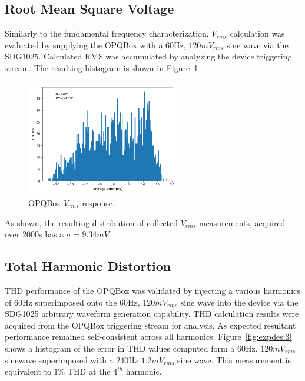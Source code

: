 \subsection{Root Mean Square Voltage}
Similarly to the fundamental frequency characterization, $V_{rms}$ calculation was evaluated by supplying the OPQBox with a 60Hz, $120mV_{rms}$ sine wave via the SDG1025.
Calculated RMS was accumulated by analyzing the device triggering stream.
The resulting histogram is shown in Figure~\ref{fig:expdes:2}

\begin{figure}[h]
    \begin{center}
        \includegraphics[width=0.6\textwidth]{img/box_eval/rms_histogram.pdf}
    \end{center}
    \caption{OPQBox $V_{rms}$ response.}
    \label{fig:expdes:2}
\end{figure}

As shown, the resulting distribution of collected $V_{rms}$ measurements, acquired over 2000s has a $\sigma=9.34mV$

\subsection{Total Harmonic Distortion}

THD performance of the OPQBox was validated by injecting a various harmonics of 60Hz superimposed onto the 60Hz, $120mV_{rms}$ sine wave into the device via the SDG1025 arbitrary waveform generation capability.
THD calculation results were acquired from the OPQBox triggering stream for analysis.
As expected resultant performance remained self-consistent across all harmonics.
Figure~\ref{fig:expdes:3} shows a histogram of the error in THD values computed form a 60Hz, $120mV_{rms}$ sinewave superimposed with a 240Hz $1.2mV_{rms}$ sine wave.
This measurement is equivalent to $1\%$ THD at the $4^{th}$ harmonic.

